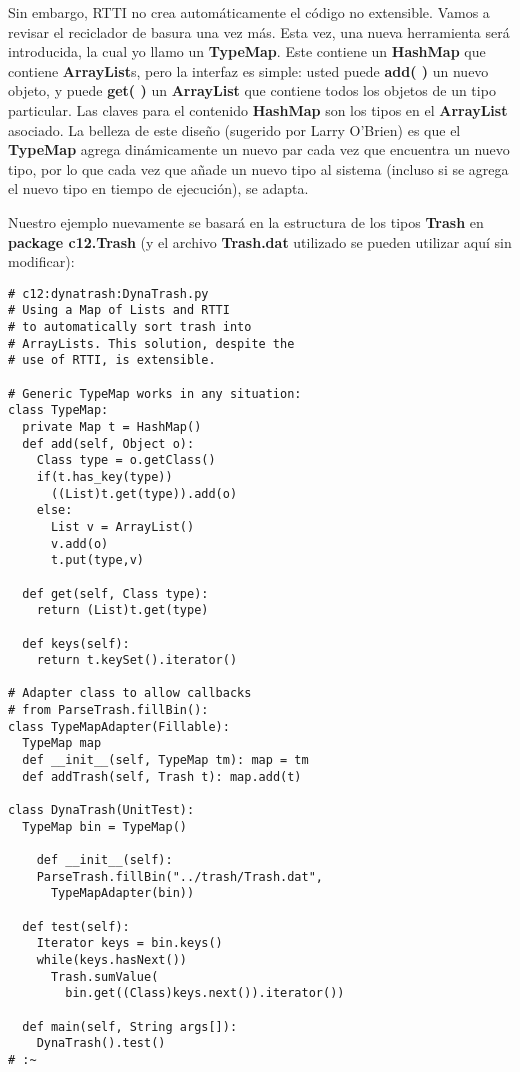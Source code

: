 Sin embargo, RTTI no crea automáticamente el código no extensible. Vamos a revisar el reciclador de basura una vez más. Esta vez, una nueva herramienta será introducida, la cual yo llamo un \textbf{TypeMap}. Este contiene un \textbf{HashMap} que contiene \textbf{ArrayList}s, pero la interfaz es simple: usted puede \textbf{add( )} un nuevo objeto, y puede \textbf{get( )} un \textbf{ArrayList} que contiene todos los objetos de un tipo particular. Las claves para el contenido \textbf{HashMap} son los tipos en el \textbf{ArrayList} asociado. La belleza de este diseño (sugerido por Larry O'Brien) es que el \textbf{TypeMap} agrega dinámicamente un nuevo par cada vez que encuentra un nuevo tipo, por lo que cada vez que añade un nuevo tipo al sistema (incluso si se agrega el nuevo tipo en tiempo de ejecución), se adapta.  \newline

Nuestro ejemplo  nuevamente se basará en la estructura de los tipos \textbf{Trash} en \textbf{package c12.Trash} (y el archivo \textbf{Trash.dat} utilizado se pueden utilizar aquí sin modificar):        \newline

\begin{lstlisting} 
# c12:dynatrash:DynaTrash.py  
# Using a Map of Lists and RTTI 
# to automatically sort trash into 
# ArrayLists. This solution, despite the 
# use of RTTI, is extensible. 

# Generic TypeMap works in any situation: 
class TypeMap: 
  private Map t = HashMap() 
  def add(self, Object o): 
    Class type = o.getClass() 
    if(t.has_key(type)) 
      ((List)t.get(type)).add(o) 
    else: 
      List v = ArrayList() 
      v.add(o) 
      t.put(type,v) 
      
  def get(self, Class type): 
    return (List)t.get(type) 
    
  def keys(self):  
    return t.keySet().iterator()  
    
# Adapter class to allow callbacks 
# from ParseTrash.fillBin(): 
class TypeMapAdapter(Fillable): 
  TypeMap map 
  def __init__(self, TypeMap tm): map = tm  
  def addTrash(self, Trash t): map.add(t)  
  
class DynaTrash(UnitTest): 
  TypeMap bin = TypeMap() 
  
    def __init__(self): 
    ParseTrash.fillBin("../trash/Trash.dat",  
      TypeMapAdapter(bin)) 
      
  def test(self): 
    Iterator keys = bin.keys() 
    while(keys.hasNext()) 
      Trash.sumValue( 
        bin.get((Class)keys.next()).iterator())
        
  def main(self, String args[]): 
    DynaTrash().test() 
# :~ 
\end{lstlisting}

